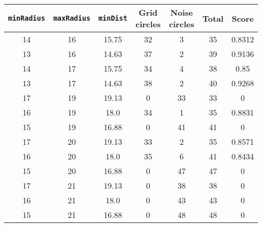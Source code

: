 \documentclass[letterpaper, 12pt]{article}
\begin{document}
\begin{longtable}{|c|c|c|c|c|c|c|}
\hline
\textbf{\texttt{minRadius}} & \textbf{\texttt{maxRadius}} & \textbf{\texttt{minDist}} & \textbf{Grid circles} & \textbf{Noise circles} & \textbf{Total} & \textbf{Score} \\
\hline
14 & 16 & 15.75 & 32 & 3 & 35 & 0.8312 \\
\hline
13 & 16 & 14.63 & 37 & 2 & 39 & 0.9136 \\
\hline
14 & 17 & 15.75 & 34 & 4 & 38 & 0.85 \\
\hline
13 & 17 & 14.63 & 38 & 2 & 40 & 0.9268 \\
\hline
17 & 19 & 19.13 & 0 & 33 & 33 & 0 \\
\hline
16 & 19 & 18.0 & 34 & 1 & 35 & 0.8831 \\
\hline
15 & 19 & 16.88 & 0 & 41 & 41 & 0 \\
\hline
17 & 20 & 19.13 & 33 & 2 & 35 & 0.8571 \\
\hline
16 & 20 & 18.0 & 35 & 6 & 41 & 0.8434 \\
\hline
15 & 20 & 16.88 & 0 & 47 & 47 & 0 \\
\hline
17 & 21 & 19.13 & 0 & 38 & 38 & 0 \\
\hline
16 & 21 & 18.0 & 0 & 43 & 43 & 0 \\
\hline
15 & 21 & 16.88 & 0 & 48 & 48 & 0 \\
\hline
\end{longtable}
\end{document}
